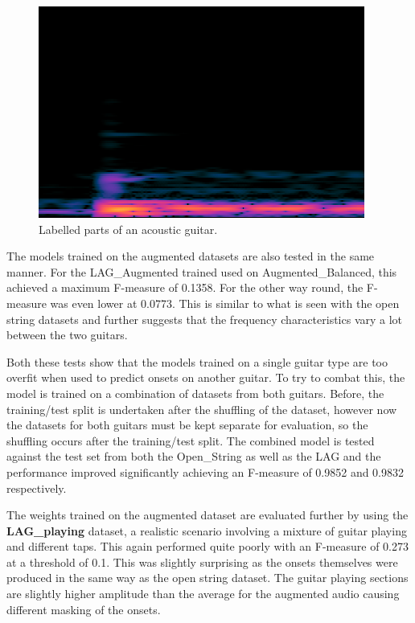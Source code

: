 \documentclass[conference]{IEEEtran}
\begin{document}
\begin{figure}[htbp]
    \centerline{\includegraphics[scale=0.4]{LAG-bridge.png}}
    \caption{Labelled parts of an acoustic guitar. \cite{b3}}
    \label{LAG-bridge}
    \end{figure}
    

The models trained on the augmented datasets are also tested in the same manner. For the LAG\_Augmented trained used on Augmented\_Balanced, this achieved a maximum F-measure of 0.1358. For the other way round, the F-measure was even lower at 0.0773. This is similar to what is seen with the open string datasets
and further suggests that the frequency characteristics vary a lot between the two guitars.

Both these tests show that the models trained on a single guitar type are too overfit when used to predict onsets on another guitar. To try to combat this, the model is trained on a combination of datasets from both guitars. Before, the training/test split is undertaken after the shuffling of the dataset,
however now the datasets for both guitars must be kept separate for evaluation, so the shuffling occurs after the training/test split. The combined model is tested against the test set from both the Open\_String as well as the LAG and the performance improved significantly achieving 
an F-measure of 0.9852 and 0.9832 respectively.

The weights trained on the augmented dataset are evaluated further by using the \textbf{LAG\_playing} dataset, a realistic scenario involving a mixture of guitar playing and different taps. This again performed quite poorly with an F-measure of 0.273 at a threshold of 0.1. This was slightly surprising as the onsets themselves
were produced in the same way as the open string dataset. The guitar playing sections are slightly higher amplitude than the average for the augmented audio causing different masking of the onsets.
\end{document}
